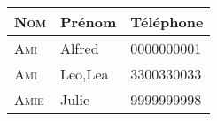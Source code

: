 \documentclass{article}
\begin{document}
\begin{tabular}{|>{\scshape}l|l|l|}
\hline
Nom&Prénom&Téléphone\\
\hline
Ami&Alfred&0000000001\\\hline
Ami&Leo,Lea&3300330033\\\hline
Amie&Julie&9999999998\\\hline
\end{tabular}
\end{document}
